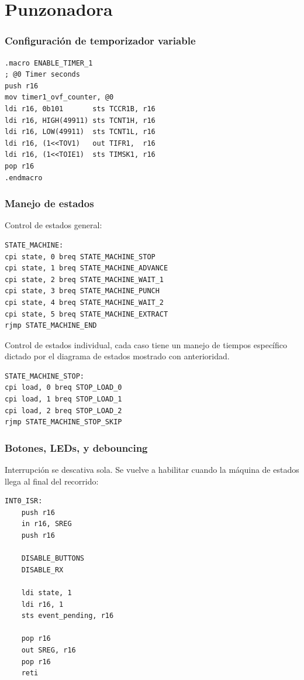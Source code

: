 \section{Punzonadora}

\subsubsection{Configuración de temporizador variable}
\begin{verbatim}
.macro ENABLE_TIMER_1
; @0 Timer seconds
push r16
mov timer1_ovf_counter, @0
ldi r16, 0b101		 sts TCCR1B, r16
ldi r16, HIGH(49911) sts TCNT1H, r16
ldi r16, LOW(49911)	 sts TCNT1L, r16 
ldi r16, (1<<TOV1)   out TIFR1,  r16 
ldi r16, (1<<TOIE1)  sts TIMSK1, r16 
pop r16
.endmacro
\end{verbatim}


\subsubsection{Manejo de estados}

Control de estados general:
\begin{verbatim}
STATE_MACHINE:
cpi state, 0 breq STATE_MACHINE_STOP
cpi state, 1 breq STATE_MACHINE_ADVANCE
cpi state, 2 breq STATE_MACHINE_WAIT_1
cpi state, 3 breq STATE_MACHINE_PUNCH
cpi state, 4 breq STATE_MACHINE_WAIT_2
cpi state, 5 breq STATE_MACHINE_EXTRACT
rjmp STATE_MACHINE_END
\end{verbatim}

Control de estados individual, cada caso tiene un manejo de tiempos específico dictado por el diagrama de estados mostrado con anterioridad.
\begin{verbatim}
STATE_MACHINE_STOP:
cpi load, 0 breq STOP_LOAD_0
cpi load, 1 breq STOP_LOAD_1
cpi load, 2 breq STOP_LOAD_2
rjmp STATE_MACHINE_STOP_SKIP
\end{verbatim}

\subsubsection{Botones, LEDs,  y debouncing}
Interrupción se descativa sola. Se vuelve a habilitar cuando la máquina de estados llega al final del recorrido:

\begin{verbatim}
INT0_ISR:
    push r16
    in r16, SREG
    push r16 

    DISABLE_BUTTONS
    DISABLE_RX

    ldi state, 1
    ldi r16, 1 
    sts event_pending, r16

    pop r16
    out SREG, r16
    pop r16 
    reti
\end{verbatim}


